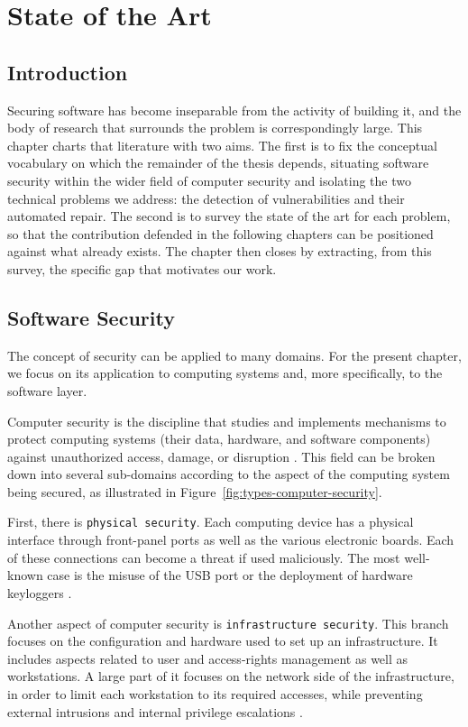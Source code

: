 \chapter{State of the Art}
\label{chap:state-of-the-art}

\section{Introduction}

Securing software has become inseparable from the activity of building it,
and the body of research that surrounds the problem is correspondingly
large. This chapter charts that literature with two aims. The first is to
fix the conceptual vocabulary on which the remainder of the thesis depends,
situating software security within the wider field of computer security and
isolating the two technical problems we address: the detection of
vulnerabilities and their automated repair. The second is to survey the
state of the art for each problem, so that the contribution defended in the
following chapters can be positioned against what already exists. The
chapter then closes by extracting, from this survey, the specific gap that
motivates our work.

\section{Software Security}

The concept of security can be applied to many domains. For the present
chapter, we focus on its application to computing systems and, more
specifically, to the software layer.

Computer security is the discipline that studies and implements mechanisms
to protect computing systems (their data, hardware, and software
components) against unauthorized access, damage, or disruption
\citep{placeholder-sast}. This field can be broken down into several
sub-domains according to the aspect of the computing system being secured,
as illustrated in Figure~\ref{fig:types-computer-security}.

First, there is \texttt{physical security}. Each computing device has a
physical interface through front-panel ports as well as the various
electronic boards. Each of these connections can become a threat if used
maliciously. The most well-known case is the misuse of the USB port or the
deployment of hardware keyloggers \citep{placeholder-detection-survey}.

Another aspect of computer security is \texttt{infrastructure security}.
This branch focuses on the configuration and hardware used to set up an
infrastructure. It includes aspects related to user and access-rights
management as well as workstations. A large part of it focuses on the
network side of the infrastructure, in order to limit each workstation to
its required accesses, while preventing external intrusions and internal
privilege escalations \citep{placeholder-detection-survey}.


